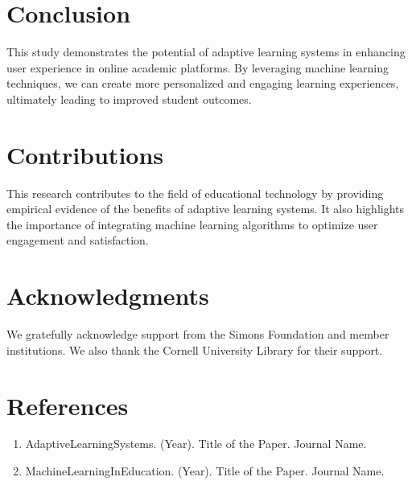 \documentclass{article}
\begin{document}
\section{Conclusion}
This study demonstrates the potential of adaptive learning systems in enhancing user experience in online academic platforms. By leveraging machine learning techniques, we can create more personalized and engaging learning experiences, ultimately leading to improved student outcomes.

\section{Contributions}
This research contributes to the field of educational technology by providing empirical evidence of the benefits of adaptive learning systems. It also highlights the importance of integrating machine learning algorithms to optimize user engagement and satisfaction.

\section*{Acknowledgments}
We gratefully acknowledge support from the Simons Foundation and member institutions. We also thank the Cornell University Library for their support.

\section*{References}
\begin{enumerate}
    \item AdaptiveLearningSystems. (Year). Title of the Paper. Journal Name.
    \item MachineLearningInEducation. (Year). Title of the Paper. Journal Name.
\end{enumerate}
\end{document}
